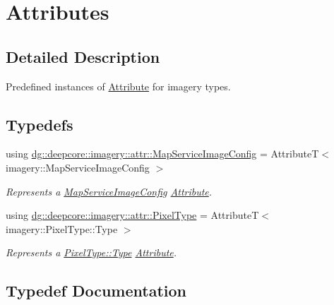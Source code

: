 \hypertarget{group___imagery_attributes}{}\section{Attributes}
\label{group___imagery_attributes}


\subsection{Detailed Description}
Predefined instances of \hyperlink{classdg_1_1deepcore_1_1_attribute}{Attribute} for imagery types. 

\subsection*{Typedefs}
\begin{DoxyCompactItemize}
\item 
using \hyperlink{group___imagery_attributes_gac05046a81d3ec2c6f4cd6ecba9c88018}{dg\+::deepcore\+::imagery\+::attr\+::\+Map\+Service\+Image\+Config} = AttributeT$<$ imagery\+::\+Map\+Service\+Image\+Config $>$
\begin{DoxyCompactList}\small\item\em Represents a \hyperlink{structdg_1_1deepcore_1_1imagery_1_1_map_service_image_config}{Map\+Service\+Image\+Config} \hyperlink{classdg_1_1deepcore_1_1_attribute}{Attribute}. \end{DoxyCompactList}\item 
using \hyperlink{group___imagery_attributes_gaa884544bf20ab4b9900b402d9243a4d0}{dg\+::deepcore\+::imagery\+::attr\+::\+Pixel\+Type} = AttributeT$<$ imagery\+::\+Pixel\+Type\+::\+Type $>$
\begin{DoxyCompactList}\small\item\em Represents a \hyperlink{namespacedg_1_1deepcore_1_1imagery_1_1_pixel_type_a5f0c62edf4601cbd15e52b381697069d}{Pixel\+Type\+::\+Type} \hyperlink{classdg_1_1deepcore_1_1_attribute}{Attribute}. \end{DoxyCompactList}\end{DoxyCompactItemize}


\subsection{Typedef Documentation}
